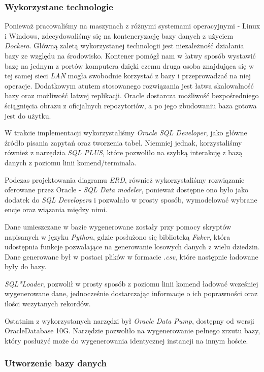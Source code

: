 \documentclass[a4paper]{article}
\begin{document}
\subsubsection{Wykorzystane technologie}

Ponieważ pracowaliśmy na maszynach z różnymi systemami operacyjnymi - Linux i Windows, zdecydowaliśmy się na konteneryzację bazy danych z użyciem\textit{ Dockera}. Główną zaletą wykorzystanej technologii jest niezależność działania bazy ze względu na środowisko. Kontener pomógł nam w łatwy sposób wystawić bazę na jednym z portów komputera dzięki czemu druga osoba znajdująca się w tej samej sieci \textit{LAN} mogła swobodnie korzystać z bazy i przeprowadzać na niej operacje. Dodatkowym atutem stosowanego rozwiązania jest łatwa skalowalność bazy oraz możliwość łatwej replikacji. Oracle dostarcza możliwość bezpośredniego ściągnięcia obrazu z oficjalnych repozytoriów, a po jego zbudowaniu baza gotowa jest do użytku.

W trakcie implementacji wykorzystaliśmy \textit{Oracle SQL Developer}, jako główne źródło pisania zapytań oraz tworzenia tabel. Niemniej jednak, korzystaliśmy również z narzędzia \textit{SQL PLUS}, które pozwoliło na szybką interakcję z bazą danych z poziomu linii komend/terminala.

Podczas projektowania diagramu \textit{ERD}, również wykorzystaliśmy rozwiązanie oferowane przez Oracle - \textit{SQL Data modeler}, ponieważ dostępne ono było jako dodatek do \textit{SQL Developera} i pozwalało w prosty sposób, wymodelować wybrane encje oraz wiązania między nimi.

Dane umieszczane w bazie wygenerowane zostały przy pomocy skryptów napisanych w języku \textit{Python}, gdzie posłużono się biblioteką \textit{Faker}, która udostępnia funkcje pozwalające na generowanie losowych danych z wielu dziedzin. Dane generowane był w postaci plików w formacie \textit{.csv}, które następnie ładowane były do bazy.

\textit{SQL*Loader}, pozwolił w prosty sposób z poziomu linii komend ładować wcześniej wygenerowane dane, jednocześnie dostarczając informacje o ich poprawności oraz ilości wczytanych rekordów.

Ostatnim z wykorzystanych narzędzi był \textit{Oracle Data Pump}, dostępny od wersji Oracle\linebreak Database 10G. Narzędzie pozwoliło na wygenerowanie pełnego zrzutu bazy, który posłużyć może do wygenerowania identycznej instancji na innym hoście.

\subsubsection{Utworzenie bazy danych}
\end{document}
